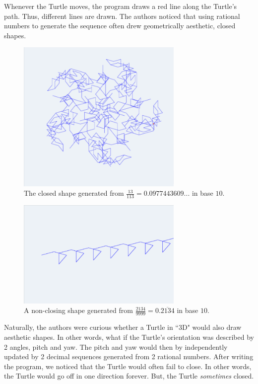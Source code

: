 \documentclass[11pt,titlepage]{article}
\begin{document}
Whenever the Turtle moves, the program draws a red line along the Turtle's path. Thus,
different lines are drawn.
The authors noticed that using rational numbers to generate the sequence often drew geometrically
aesthetic, closed shapes.

\begin{figure}[ht]
  \centering
  \includegraphics[width=8cm]{fig/Turtle1D13Div113.png}
  \caption{The closed shape generated from $\frac{13}{113} = 0.0977443609...$ in base $10$.}
\end{figure}
\begin{figure}[ht]
  \centering
  \includegraphics[width=8cm]{fig/Turtle1DNotClosed.png}
  \caption{A non-closing shape generated from $\frac{2134}{9999} = 0.\overline{2134}$ in base $10$.}
\end{figure}

Naturally, the authors were curious whether a Turtle in ``3D" would also draw 
aesthetic shapes. In other words, what if the Turtle's orientation was described
by 2 angles, pitch and yaw. The pitch and yaw would then by independently updated
by 2 decimal sequences generated from 2 rational numbers.
After writing the program, we noticed that the Turtle would often fail
to close. In other words, the Turtle would go off in one direction forever.
But, the Turtle \textit{sometimes} closed.
\end{document}
